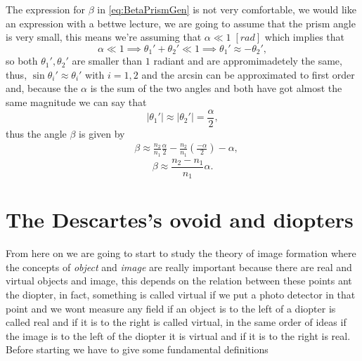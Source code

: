             The expression for $\beta$ in \ref{eq:BetaPrismGen} is not very comfortable, we would like an expression with a bettwe lecture, we are going to assume that the prism angle is very small, this means we're assuming that $\alpha \ll 1 \; [rad]$ which implies that
            \begin{equation*}
                \alpha \ll 1 \implies \theta_1 ' + \theta_2 ' \ll 1 \implies \theta_1 ' \approx - \theta_2',
            \end{equation*}
            so both $\theta_1',\theta_2'$ are smaller than $1$ radiant and are appromimadetely the same, thus, $\sin \theta_i' \approx \theta_i'$ with $i=1,2$ and the arcsin can be approximated to first order  and, because the $\alpha$ is the sum of the two angles and both have got almost the same magnitude we can say that
            \begin{equation*}
                |\theta_1'| \approx |\theta_2'| = \frac{\alpha}{2}, 
            \end{equation*}
            thus the angle $\beta$ is given by
            \begin{align}
                & \beta \approx \frac{n_2}{n_1}\frac{\alpha}{2} - \frac{n_2}{n_1}\left(\frac{-\alpha}{2}\right) - \alpha,
            \end{align}
            \begin{equation}
                \beta \approx \frac{n_2-n_1}{n_1}\alpha.
            \end{equation}
            

    \section{The Descartes's ovoid and diopters}

        From here on we are going to start to study the theory of image formation where the concepts of \emph{object} and \emph{image} are really important because there are real and virtual objects and image, this depends on the relation between these points ant the diopter, in fact, something is called virtual if we put a photo detector in that point and we wont measure any field if an object is to the left of a diopter is called real and if it is to the right is called virtual, in the same order of ideas if the image is to the left of the diopter it is virtual and if it is to the right is real.\\

        Before starting we have to give some fundamental definitions

